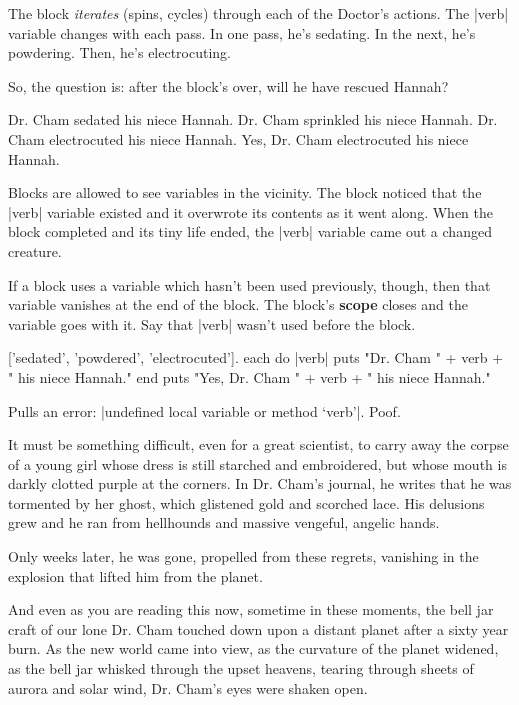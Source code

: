 \documentclass[12pt,twoside]{report}
\begin{document}
The block {\em iterates} (spins, cycles) through each of the Doctor's
actions.  The \rubyinline|verb| variable changes with
each pass.  In one pass, he's sedating.  In the next, he's powdering.
Then, he's electrocuting.

So, the question is: after the block's over, will he have rescued
Hannah?


\begin{rubycode}

 Dr. Cham sedated his niece Hannah.
 Dr. Cham sprinkled his niece Hannah.
 Dr. Cham electrocuted his niece Hannah.
 Yes, Dr. Cham electrocuted his niece Hannah.

\end{rubycode}


Blocks are allowed to see variables in the vicinity.  The block
noticed that the \rubyinline|verb| variable existed
and it overwrote its contents as it went along.  When the block
completed and its tiny life ended, the
\rubyinline|verb| variable came out a changed
creature.

If a block uses a variable which hasn't been used previously, though,
then that variable vanishes at the end of the block.  The block's {\bf
  scope} closes and the variable goes with it.  Say that
\rubyinline|verb| wasn't used before the block.

\pagebreak

\begin{rubycode}

 ['sedated', 'powdered', 'electrocuted'].
 each do |verb|
   puts "Dr. Cham " + verb + " his niece Hannah."
 end
 puts "Yes, Dr. Cham " + verb + " his niece Hannah."

\end{rubycode}

Pulls an error: 
\rubyinline|undefined local variable or method `verb'|.  
Poof.

It must be something difficult, even for a great scientist, to carry
away the corpse of a young girl whose dress is still starched and
embroidered, but whose mouth is darkly clotted purple at the corners.
In Dr. Cham's journal, he writes that he was tormented by her ghost,
which glistened gold and scorched lace.  His delusions grew and he ran
from hellhounds and massive vengeful, angelic hands.

Only weeks later, he was gone, propelled from these regrets, vanishing
in the explosion that lifted him from the planet.

And even as you are reading this now, sometime in these moments, the
bell jar craft of our lone Dr. Cham touched down upon a distant planet
after a sixty year burn.  As the new world came into view, as the
curvature of the planet widened, as the bell jar whisked through the
upset heavens, tearing through sheets of aurora and solar wind,
Dr. Cham's eyes were shaken open.
\end{document}
